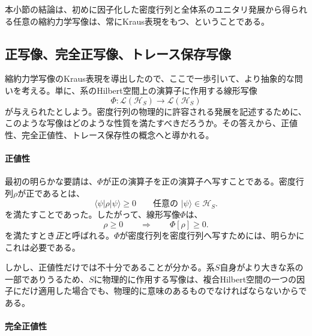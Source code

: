 \documentclass[a4paper,11pt,oneside]{article}
\theoremstyle{definition}
\numberwithin{equation}{section}
\begin{document}
本小節の結論は、初めに因子化した密度行列と全体系のユニタリ発展から得られる任意の縮約力学写像は、常にKraus表現をもつ、ということである。





\subsection{正写像、完全正写像、トレース保存写像}



縮約力学写像のKraus表現を導出したので、ここで一歩引いて、より抽象的な問いを考える。単に、系のHilbert空間上の演算子に作用する線形写像
\begin{equation}
\Phi : \mathcal L(\mathcal H_S) \to \mathcal L(\mathcal H_S)
\end{equation}
が与えられたとしよう。密度行列の物理的に許容される発展を記述するために、このような写像はどのような性質を満たすべきだろうか。その答えから、正値性、完全正値性、トレース保存性の概念へと導かれる。



\paragraph{正値性}



最初の明らかな要請は、$\Phi$が正の演算子を正の演算子へ写すことである。密度行列$\rho$が正であるとは、
\begin{equation}
\langle \psi | \rho | \psi \rangle \geq 0
\qquad
\text{任意の } |\psi\rangle \in \mathcal H_S .
\end{equation}
を満たすことであった。したがって、線形写像$\Phi$は、
\begin{equation}
\rho \geq 0
\qquad \Longrightarrow \qquad
\Phi[\rho] \geq 0 .
\end{equation}
を満たすとき\textit{正}と呼ばれる。$\Phi$が密度行列を密度行列へ写すためには、明らかにこれは必要である。



しかし、正値性だけでは不十分であることが分かる。系$S$自身がより大きな系の一部でありうるため、$S$に物理的に作用する写像は、複合Hilbert空間の一つの因子にだけ適用した場合でも、物理的に意味のあるものでなければならないからである。



\paragraph{完全正値性}
\end{document}
